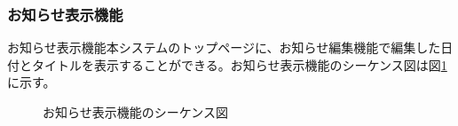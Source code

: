 \documentclass[a4j]{jarticle}
\begin{document}
  \subsubsection{お知らせ表示機能}
  お知らせ表示機能本システムのトップページに、お知らせ編集機能で編集した日付とタイトルを表示することができる。お知らせ表示機能のシーケンス図は図\ref{fig:admin_news_display.png}に示す。
  \begin{figure}[H]
    \centering
    \caption{お知らせ表示機能のシーケンス図}
    \label{fig:admin_news_display.png}
  \end{figure}
\end{document}
